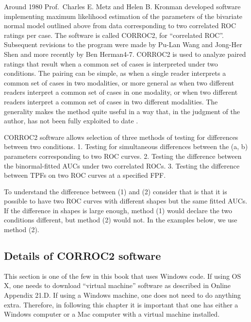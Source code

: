 \documentclass[
]{book}
\begin{document}
Around 1980 Prof.~Charles E. Metz and Helen B. Kronman developed software implementing maximum likelihood estimation of the parameters of the bivariate normal model outlined above from data corresponding to two correlated ROC ratings per case. The software is called CORROC2, for ``correlated ROC''. Subsequent revisions to the program were made by Pu-Lan Wang and Jong-Her Shen and more recently by Ben Herman4-7. CORROC2 is used to analyze paired ratings that result when a common set of cases is interpreted under two conditions. The pairing can be simple, as when a single reader interprets a common set of cases in two modalities, or more general as when two different readers interpret a common set of cases in one modality, or when two different readers interpret a common set of cases in two different modalities. The generality makes the method quite useful in a way that, in the judgment of the author, has not been fully exploited to date .

CORROC2 software allows selection of three methods of testing for differences between two conditions.
1. Testing for simultaneous differences between the (a, b) parameters corresponding to two ROC curves.
2. Testing the difference between the binormal-fitted AUCs under two correlated ROCs.
3. Testing the difference between TPFs on two ROC curves at a specified FPF.

To understand the difference between (1) and (2) consider that is that it is possible to have two ROC curves with different shapes but the same fitted AUCs. If the difference in shapes is large enough, method (1) would declare the two conditions different, but method (2) would not. In the examples below, we use method (2).

\hypertarget{bivariate-binormal-model-corroc2-details}{%
\subsection{Details of CORROC2 software}\label{bivariate-binormal-model-corroc2-details}}

This section is one of the few in this book that uses Windows code. If using OS X, one needs to download ``virtual machine'' software as described in Online Appendix 21.D. If using a Windows machine, one does not need to do anything extra. Therefore, in following this chapter it is important that one has either a Windows computer or a Mac computer with a virtual machine installed.
\end{document}
